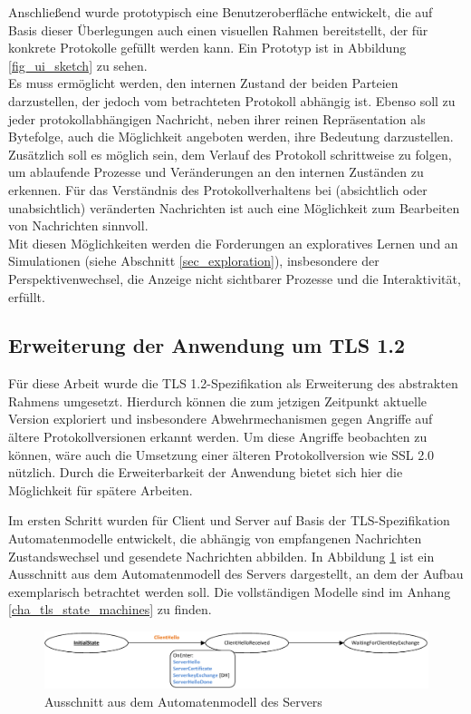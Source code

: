 Anschließend wurde prototypisch eine Benutzeroberfläche entwickelt, die auf Basis dieser Überlegungen auch einen visuellen Rahmen bereitstellt, der für konkrete Protokolle gefüllt werden kann. Ein Prototyp ist in Abbildung \ref{fig_ui_sketch} zu sehen.\\
Es muss ermöglicht werden, den internen Zustand der beiden Parteien darzustellen, der jedoch vom betrachteten Protokoll abhängig ist. Ebenso soll zu jeder protokollabhängigen Nachricht, neben ihrer reinen Repräsentation als Bytefolge, auch die Möglichkeit angeboten werden, ihre Bedeutung darzustellen. Zusätzlich soll es möglich sein, dem Verlauf des Protokoll schrittweise zu folgen, um ablaufende Prozesse und Veränderungen an den internen Zuständen zu erkennen. Für das Verständnis des Protokollverhaltens bei (absichtlich oder unabsichtlich) veränderten Nachrichten ist auch eine Möglichkeit zum Bearbeiten von Nachrichten sinnvoll.\\
Mit diesen Möglichkeiten werden die Forderungen an exploratives Lernen und an Simulationen (siehe Abschnitt \ref{sec_exploration}), insbesondere der Perspektivenwechsel, die Anzeige nicht sichtbarer Prozesse und die Interaktivität, erfüllt.

\subsection{Erweiterung der Anwendung um TLS 1.2}
\label{sec_analysis_tls_plugin}

Für diese Arbeit wurde die TLS 1.2-Spezifikation als Erweiterung des abstrakten Rahmens umgesetzt. Hierdurch können die zum jetzigen Zeitpunkt aktuelle Version exploriert und insbesondere Abwehrmechanismen gegen Angriffe auf ältere Protokollversionen erkannt werden. Um diese Angriffe beobachten zu können, wäre auch die Umsetzung einer älteren Protokollversion wie SSL 2.0 nützlich. Durch die Erweiterbarkeit der Anwendung bietet sich hier die Möglichkeit für spätere Arbeiten.

Im ersten Schritt wurden für Client und Server auf Basis der TLS-Spezifikation Automatenmodelle entwickelt, die abhängig von empfangenen Nachrichten Zustandswechsel und gesendete Nachrichten abbilden. In Abbildung \ref{fig_state_machine_server_part} ist ein Ausschnitt aus dem Automatenmodell des Servers dargestellt, an dem der Aufbau exemplarisch betrachtet werden soll. Die vollständigen Modelle sind im Anhang \ref{cha_tls_state_machines} zu finden.

\begin{figure}[H]
	\centering
	\includegraphics[width=15cm]{Diagrams/statemachines/server_state_machine_AUSSCHNITT.pdf} %
	\caption{Ausschnitt aus dem Automatenmodell des Servers}
	\label{fig_state_machine_server_part}
\end{figure}

